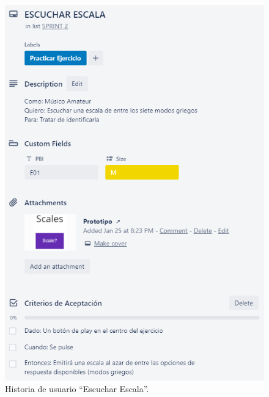 \documentclass[12pt,twoside,titlepage]{report}
\begin{document}
\begin{figure}[H]
    \centering
    \includegraphics[scale=1.3]{Scrum/User Stories/Escalas}
    \caption{Historia de usuario ``Escuchar Escala''.}
    \label{fig:Escalas}
\end{figure}
\end{document}
